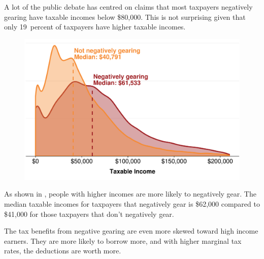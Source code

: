 \documentclass{grattan}\usepackage[]{graphicx}\usepackage[]{color}
\begin{document}
A lot of the public debate has centred on claims that most taxpayers negatively gearing have taxable incomes below \$80,000. This is not surprising given that only 19~percent of taxpayers have higher taxable incomes. 

\begin{figure}

\includegraphics[width=\columnwidth]{CGT-NG-atlas//tx-inc-distr-by-NG-1}
\end{figure}


As shown in , people with higher incomes are more likely to negatively gear. The median taxable incomes for taxpayers that negatively gear is \$62,000 compared to  \$41,000 for those taxpayers that don't negatively gear.


The tax benefits from negative gearing are even more skewed toward high income earners. They are more likely to borrow more, and with higher marginal tax rates, the deductions are worth more. 
\end{document}
